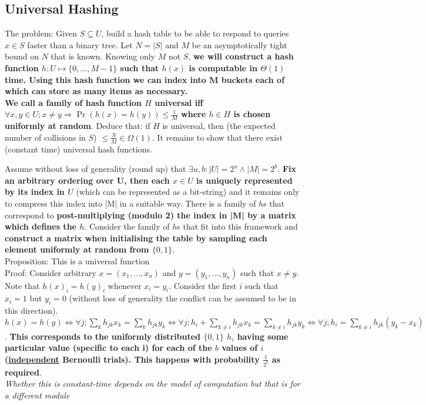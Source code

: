 \documentclass[20pt,a4paper,landscape]{extarticle}
\begin{document}
\begin{flushleft}
\subsection{Universal Hashing}
The problem: Given $S \subseteq U$, build a hash table to be able to respond to queries $x \in S$ faster than a binary tree. Let $N = |S|$ and $M$ be an asymptotically tight bound on $N$ that is known. Knowing only $M$ not $S$, \textbf{we will construct a hash function $h: U \mapsto \{0, ..., M-1\}$ such that $h(x)$ is computable in $\Theta(1)$ time. Using this hash function we can index into M buckets each of which can store as many items as necessary.\\
We call a family of hash function $H$ universal iff $\forall x, y \in U; x \neq y \Rightarrow \Pr(h(x) = h(y)) \leq \frac{1}{M}$ where $h \in H$ is chosen uniformly at random}. Deduce that: if $H$ is universal, then (the expected number of collisions in $S$) $\leq \frac{N}{M} \in \Omega(1)$. It remains to show that there exist (constant time) universal hash functions.

Assume without loss of generality (round up) that $\exists u, b: |U| = 2^u \land |M| = 2^b$. \textbf{Fix an arbitrary ordering over U, then each $x \in U$ is uniquely represented by its index in $U$} (which can be represented as a bit-string) and it remains only to compress this index into |M| in a suitable way. There is a family of $h$s that correspond to \textbf{post-multiplying (modulo 2) the index in |M| by a matrix which defines the $h$}. Consider the family of $h$s that fit into this framework and \textbf{construct a matrix when initialising the table by sampling each element uniformly at random from $\{0, 1\}$}.\\
Proposition: This is a universal function\\
Proof: Consider arbitrary $x=(x_1, ..., x_n)$ and $y=(y_1, ..., y_n)$ such that $x \neq y$. Note that $h(x)_i = h(y)_i$ whenever $x_i=y_i$. Consider the first $i$ such that $x_i=1$ but $y_i=0$ (without loss of generality the conflict can be assumed to be in this direction). $h(x) = h(y) \Leftrightarrow \forall j; \sum_k h_{jk}x_k = \sum_k h_{jk}y_k \Leftrightarrow \forall j; h_i + \sum_{k \neq i} h_{jk}x_k = \sum_{k \neq i} h_{jk}y_k \Leftrightarrow \forall j; h_i = \sum_{k \neq i} h_{jk}(y_k - x_k)$. \textbf{This corresponds to the uniformly distributed $\{0, 1\}$ $h_i$ having some particular value (specific to each i) for each of the $b$ values of $i$ (\underline{independent} Bernoulli trials). This happens with probability $\frac{1}{2^b}$ as required}.\\
\textit{Whether this is constant-time depends on the model of computation but that is for a different module}
\end{flushleft}
\end{document}
